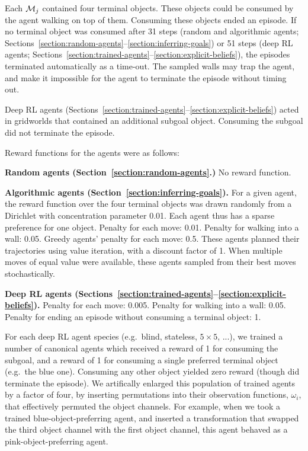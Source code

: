 \documentclass{article}
\begin{document}
Each $\mathcal{M}_j$ contained four terminal objects. These objects could be consumed by the agent walking on top of them. Consuming these objects ended an episode. If no terminal object was consumed after 31 steps (random and algorithmic agents; Sections~\ref{section:random-agents}--\ref{section:inferring-goals}) or 51 steps (deep RL agents; Sections~\ref{section:trained-agents}--\ref{section:explicit-beliefs}), the episodes terminated automatically as a time-out. The sampled walls may trap the agent, and make it impossible for the agent to terminate the episode without timing out.

Deep RL agents (Sections~\ref{section:trained-agents}--\ref{section:explicit-beliefs}) acted in gridworlds that contained an additional subgoal object. Consuming the subgoal did not terminate the episode.

Reward functions for the agents were as follows:

{\bf Random agents (Section~\ref{section:random-agents}.)} No reward function.

{\bf Algorithmic agents (Section~\ref{section:inferring-goals}).} For a given agent, the reward function over the four terminal objects was drawn randomly from a Dirichlet with concentration parameter 0.01. Each agent thus has a sparse preference for one object. Penalty for each move: 0.01. Penalty for walking into a wall: 0.05. Greedy agents' penalty for each move: 0.5. These agents planned their trajectories using value iteration, with a discount factor of 1. When multiple moves of equal value were available, these agents sampled from their best moves stochastically.

{\bf Deep RL agents (Sections~\ref{section:trained-agents}--\ref{section:explicit-beliefs}).} Penalty for each move: 0.005. Penalty for walking into a wall: 0.05. Penalty for ending an episode without consuming a terminal object: 1.

For each deep RL agent species (e.g.\ blind, stateless, $5\times5$, ...), we trained a number of canonical agents which received a reward of 1 for consuming the subgoal, and a reward of 1 for consuming a single preferred terminal object (e.g.\ the blue one). Consuming any other object yielded zero reward (though did terminate the episode). We artifically enlarged this population of trained agents by a factor of four, by inserting permutations into their observation functions, $\omega_i$, that effectively permuted the object channels. For example, when we took a trained blue-object-preferring agent, and inserted a transformation that swapped the third object channel with the first object channel, this agent behaved as a pink-object-preferring agent.
\end{document}
